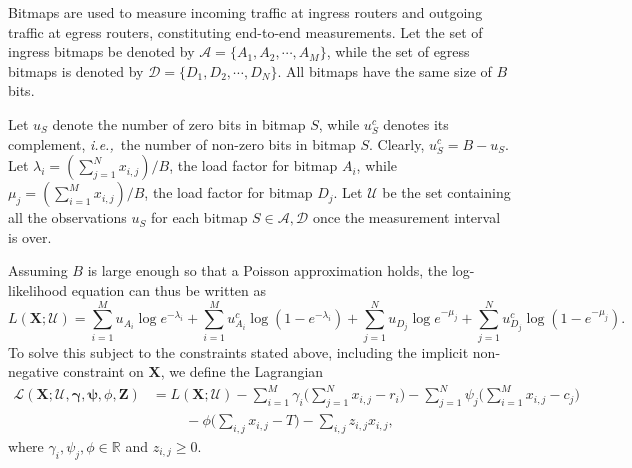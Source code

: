\documentclass[12pt]{article}
\numberwithin{equation}{section}
\numberwithin{table}{section}
\numberwithin{figure}{section}
\newcommand{\be}{\begin{equation}}
\newcommand{\ee}{\end{equation}}
\newcommand{\Real}{\mathbb R}
\def\ie{\textit{i.e.,}}
\def\bX{\mathbf{X}}
\def\bZ{\mathbf{Z}}
\def\cA{\mathcal{A}}
\def\cD{\mathcal{D}}
\def\cL{\mathcal{L}}
\def\cU{\mathcal{U}}
\def\bpsi{\boldsymbol{\psi}}
\def\bgamma{\boldsymbol{\gamma}}
\begin{document}
Bitmaps are used to measure incoming traffic at ingress routers and outgoing traffic at egress routers, constituting end-to-end measurements.
Let the set of ingress bitmaps be denoted by $\cA = \{ A_1, A_2, \cdots, A_M\}$, while the set of egress bitmaps is denoted by $\cD = \{D_1,
D_2,\cdots, D_N\}$. All bitmaps have the same size of $B$ bits. 

Let $u_{S}$ denote the number of zero bits in bitmap $S$, while $u^c_{S}$ denotes its complement, \ie~the number of non-zero bits in bitmap 
$S$. Clearly, $u^c_{S} = B- u_{S}$. Let $\lambda_i = (\sum_{j=1}^N x_{i,j})/B$, the load factor for bitmap $A_i$, while 
$\mu_j = (\sum_{i=1}^M x_{i,j})/B$, the load factor for bitmap $D_j$. Let $\cU$ be the set containing all the observations $u_{S}$ for each bitmap 
$S \in \cA, \cD$ once the measurement interval is over.
 
 Assuming $B$ is large enough so that a Poisson approximation holds, the log-likelihood equation can thus be written as
\be
L(\bX ; \cU) = \sum_{i=1}^M u_{A_i} \log e^{-\lambda_i} + \sum_{i=1}^M u^c_{A_i} \log (1-e^{-\lambda_i}) + \sum_{j=1}^N u_{D_j} \log e^{-\mu_j} + \sum_{j=1}^N u^c_{D_j} \log (1-e^{-\mu_j}).
\label{eq:likelihood}
\ee
To solve this subject to the constraints stated above, including the implicit non-negative constraint on $\bX$, we define the Lagrangian
\begin{align}
\label{eq:lagrangian}
\cL(\bX; \cU, \bgamma, \bpsi, \phi, \bZ) &= L(\bX ; \cU) - \sum_{i=1}^M \gamma_i \Big(\sum_{j=1}^N x_{i,j} - r_i\Big) - \sum_{j=1}^N \psi_j 
\Big(\sum_{i=1}^M x_{i,j} - c_j\Big) \\
\nonumber
&\hspace{1cm} -\phi \Big( \sum_{i,j} x_{i,j} - T\Big) - \sum_{i,j} z_{i,j} x_{i,j},
\end{align}
where $\gamma_i, \psi_j, \phi \in \Real$ and $z_{i,j} \ge 0$. 
\end{document}
